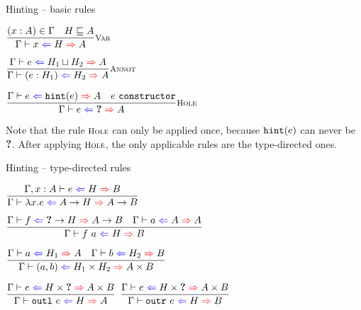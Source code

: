 \documentclass{beamer}
\newcommand{\Fun}[2]{#1 \to #2}
\newcommand{\Prod}[2]{#1 \times #2}
\newcommand{\annot}[2]{(#1 : #2)}
\newcommand{\fun}[2]{\lambda #1. #2}
\newcommand{\app}[2]{#1\ #2}
\newcommand{\pair}[2]{(#1, #2)}
\newcommand{\outl}[1]{\texttt{outl}\ #1}
\newcommand{\outr}[1]{\texttt{outr}\ #1}
\newcommand{\rulename}[1]{\textsc{\footnotesize{#1}}}
\newcommand{\infrule}[3][]{\displaystyle \frac{#2}{#3} \rulename{#1}}
\newcommand{\extend}[3]{#1, #2 : #3}
\newcommand{\sidecond}[1]{#1}
\begin{document}
\begin{frame}{Hinting -- basic rules}

\begin{center}
  $\infrule[Var]{\sidecond{(x : A) \in \Gamma} \quad \sidecond{\hintorder{H}{A}}}{\hinting{x}{H}{A}}$

  \vspace{2em}

  $\infrule[Annot]{\hinting{e}{\combinehints{H_1}{H_2}}{A}}{\hinting{\annot{e}{H_1}}{H_2}{A}}$

  \vspace{2em}

  $\infrule[Hole]{\hinting{e}{\hintfor{e}}{A} \quad \sidecond{e\ \texttt{constructor}}}{\hinting{e}{\Hole}{A}}$
\end{center}

\vspace{2em}

Note that the rule $\rulename{Hole}$ can only be applied once, because $\texttt{hint}(e)$ can never be $\textbf{?}$. After applying $\rulename{Hole}$, the only applicable rules are the type-directed ones.

\end{frame}

\begin{frame}{Hinting -- type-directed rules}
  
\begin{center}
  $\infrule{\fullhinting{\extend{\Gamma}{x}{A}}{e}{H}{B}}{\hinting{\fun{x}{e}}{\Fun{A}{H}}{\Fun{A}{B}}}$

  \vspace{1em}

  $\infrule{\hinting{f}{\Fun{\Hole}{H}}{\Fun{A}{B}} \quad \hinting{a}{A}{A}}{\hinting{\app{f}{a}}{H}{B}}$

  \vspace{1em}

  $\infrule{\hinting{a}{H_1}{A} \quad \hinting{b}{H_2}{B}}{\hinting{\pair{a}{b}}{\Prod{H_1}{H_2}}{\Prod{A}{B}}}$

  \vspace{1em}

  $\infrule{\hinting{e}{\Prod{H}{\Hole}}{\Prod{A}{B}}}{\hinting{\outl{e}}{H}{A}}$ \quad
  $\infrule{\hinting{e}{\Prod{H}{\Hole}}{\Prod{A}{B}}}{\hinting{\outr{e}}{H}{B}}$
\end{center}
  
\end{frame}
  
\end{document}
